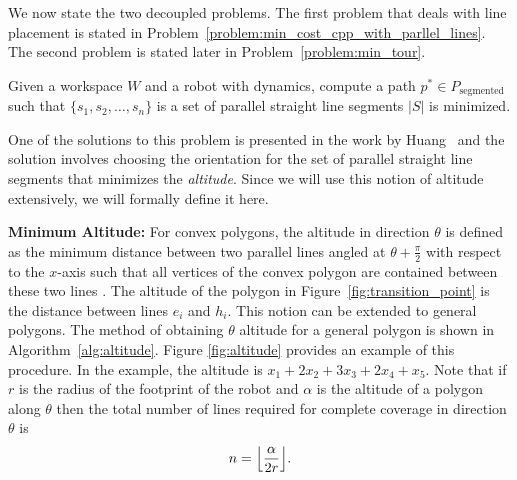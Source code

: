 \documentclass[../main.tex]{subfiles}
\begin{document}

We now state the two decoupled problems. The first problem that deals with line placement is stated in Problem~\ref{problem:min_cost_cpp_with_parllel_lines}. The second problem is stated later in Problem~\ref{problem:min_tour}.
\begin{problem}
\label{problem:min_cost_cpp_with_parllel_lines}
	Given a workspace $W$ and a robot with dynamics, compute a path $p^*\in P_{\text{segmented}}$ such that $\{s_1,s_2,\dots,s_n\}$ is a set of parallel straight line segments $|S|$ is minimized.
\end{problem} 

One of the solutions to this problem is presented in the work by Huang~\cite{Huang2001optimal} and the solution involves choosing the orientation for the set of parallel straight line segments that minimizes the \emph{altitude}. Since we will use this notion of altitude extensively, we will formally define it here.

\textbf{Minimum Altitude:} For convex polygons, the altitude in direction $\theta$ is defined as the minimum distance between two parallel lines angled at $\theta+\frac{\pi}{2}$ with respect to the $x$-axis such that all vertices of the convex polygon are contained between these two lines \cite{Huang2001optimal}. The altitude of the polygon in Figure~\ref{fig:transition_point} is the distance between lines $e_i$ and $h_i$. This notion can be extended to general polygons. The method of obtaining $\theta$ altitude for a general polygon is shown in Algorithm~\ref{alg:altitude}. Figure \ref{fig:altitude} provides an example of this procedure. In the example, the altitude is $x_1 + 2x_2 + 3x_3 + 2x_4 + x_5$. Note that if $r$ is the radius of the footprint of the robot and $\alpha$ is the altitude of a polygon along $\theta$ then the total number of lines required for complete coverage in direction $\theta$ is
\begin{equation}
	n=\floor*{\frac{\alpha}{2r}}.
\end{equation}
\end{document}
